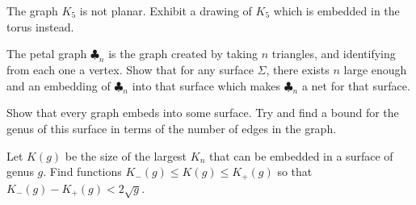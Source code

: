 \begin{exercise}
The graph $K_5$ is not planar. Exhibit a drawing of $K_5$ which is embedded in the torus instead. 
\end{exercise}
\begin{exercise}
The petal graph $\clubsuit_n$ is the graph created by taking $n$ triangles, and identifying from each one a vertex.  Show that for any surface $\Sigma$, there exists $n$ large enough and an embedding of $\clubsuit_n$ into that surface which makes $\clubsuit_n$ a net for that surface. 	
\end{exercise}
\begin{exercise}
Show that every graph embeds into some surface. Try and find a bound for the genus of this surface in terms of the number of edges in the graph. 
\end{exercise}

\begin{exercise}
 Let $K(g)$ be the size of the largest $K_n$ that can be embedded in a surface of genus $g$. Find functions $K_-(g) \leq K (g) \leq K_+(g)$ so that $K_-(g)-K_+(g) <2 \sqrt{g}$. 
\end{exercise}
